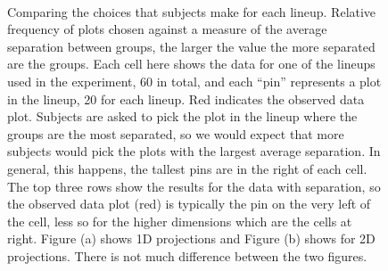 \begin{figure}[htbp]
\centering
\mbox{\quad
{}}
\caption{Comparing the choices that subjects make for each lineup. Relative frequency of plots chosen against a measure of the average separation between groups, the larger the value the more separated are the groups. Each cell here shows the data for one of the lineups used in the experiment, 60 in total, and each ``pin'' represents a plot in the lineup, 20 for each lineup. Red indicates the observed data plot. Subjects are asked to pick the plot in the lineup where the groups are the most separated, so we would expect that more subjects would pick the plots with the largest average separation. In general, this happens, the tallest pins are in the right of each cell. The top three rows show the results for the data with separation, so the observed data plot (red) is typically the pin on the very left of the cell, less so for the higher dimensions which are the cells at right. Figure (a) shows 1D projections and Figure (b) shows for 2D projections. There is not much difference between the two figures. } 
\label{sep}
\end{figure}

